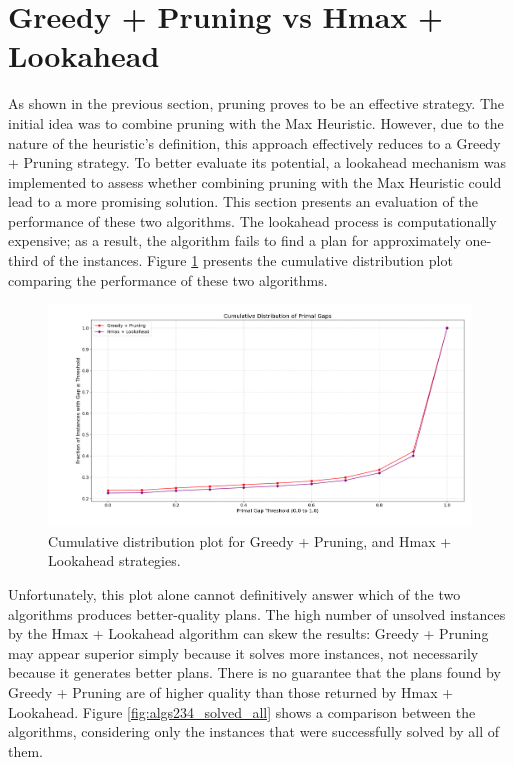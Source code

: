 \section{Greedy + Pruning vs Hmax + Lookahead}
As shown in the previous section, pruning proves to be an effective strategy.
The initial idea was to combine pruning with the Max Heuristic. However, due to the nature of the heuristic’s definition,
this approach effectively reduces to a Greedy + Pruning strategy. To better evaluate its potential,
a lookahead mechanism was implemented to assess whether combining pruning with the Max Heuristic could lead
to a more promising solution. This section presents an evaluation of the performance of these two algorithms.
The lookahead process is computationally expensive; as a result, the algorithm fails to find a plan for approximately
one-third of the instances. Figure \ref{fig:algs23} presents the cumulative distribution plot comparing the performance
of these two algorithms.

\begin{figure}[ht]
	\centering
	\includegraphics[width=\textwidth]{images/algs23.png}
	\caption{Cumulative distribution plot for Greedy + Pruning, and Hmax + Lookahead strategies.}
	\label{fig:algs23}
\end{figure}

Unfortunately, this plot alone cannot definitively answer which of the two algorithms produces better-quality plans.
The high number of unsolved instances by the Hmax + Lookahead algorithm can skew the results: Greedy + Pruning may
appear superior simply because it solves more instances, not necessarily because it generates better plans.
There is no guarantee that the plans found by Greedy + Pruning are of higher quality than those returned by Hmax + Lookahead.
Figure \ref{fig:algs234_solved_all} shows a comparison between the algorithms, considering only the instances that were successfully
solved by all of them.

